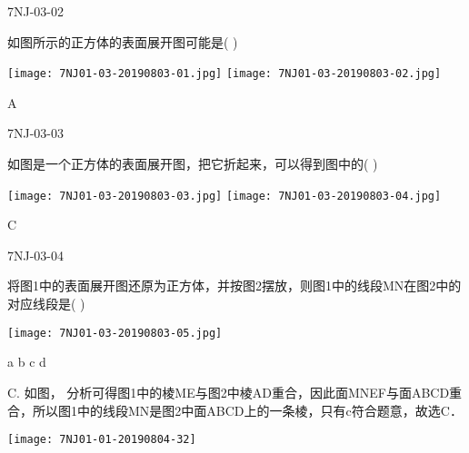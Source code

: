 \begin{defproblem}{7NJ-03-02}%
\begin{onlyproblem}%
如图所示的正方体的表面展开图可能是(    ) 
\begin{center}
\texttt{[image: 7NJ01-03-20190803-01.jpg]}
\texttt{[image: 7NJ01-03-20190803-02.jpg]}
\end{center}

\end{onlyproblem}%
\begin{onlysolution}%
\begin{solution}%
A
\end{solution}%
\end{onlysolution}%
\end{defproblem}




\begin{defproblem}{7NJ-03-03}%
\begin{onlyproblem}%
如图是一个正方体的表面展开图，把它折起来，可以得到图中的(    ) 
\begin{center}
\texttt{[image: 7NJ01-03-20190803-03.jpg]}
\texttt{[image: 7NJ01-03-20190803-04.jpg]}
\end{center}


\end{onlyproblem}%
\begin{onlysolution}%
\begin{solution}%
C
\end{solution}%
\end{onlysolution}%
\end{defproblem}




\begin{defproblem}{7NJ-03-04}%
\begin{onlyproblem}%
将图1中的表面展开图还原为正方体，并按图2摆放，则图1中的线段MN在图2中的对应线段是(    ) 
\begin{center}
\texttt{[image: 7NJ01-03-20190803-05.jpg]}
\end{center}

\xx
{a}
{b}
{c}
{d}

\end{onlyproblem}%
\begin{onlysolution}%
\begin{solution}%
C.
如图，   分析可得图1中的棱ME与图2中棱AD重合，因此面MNEF与面ABCD重合，所以图1中的线段MN是图2中面ABCD上的一条棱，只有c符合题意，故选C． 
\begin{center}
\texttt{[image: 7NJ01-01-20190804-32]}
\end{center}
\end{solution}%
\end{onlysolution}%
\end{defproblem}









